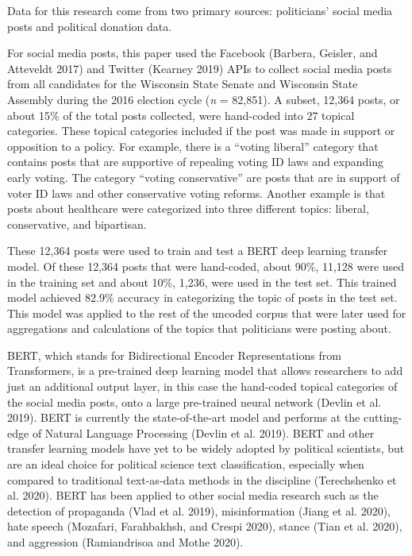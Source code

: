 \documentclass[12pt,]{article}
\begin{document}
Data for this research come from two primary sources: politicians'
social media posts and political donation data.

For social media posts, this paper used the Facebook (Barbera, Geisler,
and Atteveldt 2017) and Twitter (Kearney 2019) APIs to collect social
media posts from all candidates for the Wisconsin State Senate and
Wisconsin State Assembly during the 2016 election cycle (\emph{n} =
82,851). A subset, 12,364 posts, or about 15\% of the total posts
collected, were hand-coded into 27 topical categories. These topical
categories included if the post was made in support or opposition to a
policy. For example, there is a ``voting liberal'' category that
contains posts that are supportive of repealing voting ID laws and
expanding early voting. The category ``voting conservative'' are posts
that are in support of voter ID laws and other conservative voting
reforms. Another example is that posts about healthcare were categorized
into three different topics: liberal, conservative, and bipartisan.

These 12,364 posts were used to train and test a BERT deep learning
transfer model. Of these 12,364 posts that were hand-coded, about 90\%,
11,128 were used in the training set and about 10\%, 1,236, were used in
the test set. This trained model achieved 82.9\% accuracy in
categorizing the topic of posts in the test set. This model was applied
to the rest of the uncoded corpus that were later used for aggregations
and calculations of the topics that politicians were posting about.

BERT, which stands for Bidirectional Encoder Representations from
Transformers, is a pre-trained deep learning model that allows
researchers to add just an additional output layer, in this case the
hand-coded topical categories of the social media posts, onto a large
pre-trained neural network (Devlin et al. 2019). BERT is currently the
state-of-the-art model and performs at the cutting-edge of Natural
Language Processing (Devlin et al. 2019). BERT and other transfer
learning models have yet to be widely adopted by political scientists,
but are an ideal choice for political science text classification,
especially when compared to traditional text-as-data methods in the
discipline (Terechshenko et al. 2020). BERT has been applied to other
social media research such as the detection of propaganda (Vlad et al.
2019), misinformation (Jiang et al. 2020), hate speech (Mozafari,
Farahbakhsh, and Crespi 2020), stance (Tian et al. 2020), and aggression
(Ramiandrisoa and Mothe 2020).
\end{document}
